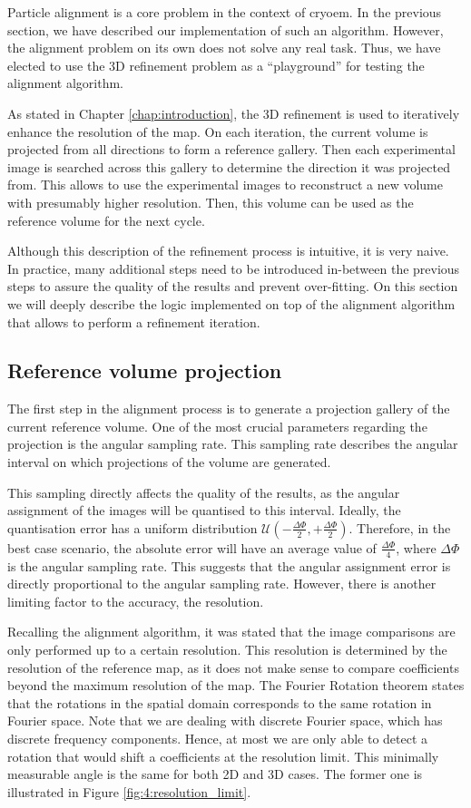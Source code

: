 \documentclass[../main.tex]{subfiles}
\begin{document}
Particle alignment is a core problem in the context of \gls{cryoem}. In the previous section, we have described our implementation of such an algorithm. However, the alignment problem on its own does not solve any real task. Thus, we have elected to use the 3D refinement problem as a ``playground'' for testing the alignment algorithm.

As stated in Chapter \ref{chap:introduction}, the 3D refinement is used to iteratively enhance the resolution of the map. On each iteration, the current volume is projected from all directions to form a reference gallery. Then each experimental image is searched across this gallery to determine the direction it was projected from. This allows to use the experimental images to reconstruct a new volume with presumably higher resolution. Then, this volume can be used as the reference volume for the next cycle.

Although this description of the refinement process is intuitive, it is very naive. In practice, many additional steps need to be introduced in-between the previous steps to assure the quality of the results and prevent over-fitting. On this section we will deeply describe the logic implemented on top of the alignment algorithm that allows to perform a refinement iteration.

\subsection{Reference volume projection}
The first step in the alignment process is to generate a projection gallery of the current reference volume. One of the most crucial parameters regarding the projection is the angular sampling rate. This sampling rate describes the angular interval on which projections of the volume are generated. 

This sampling directly affects the quality of the results, as the angular assignment of the images will be quantised to this interval. Ideally, the quantisation error has a uniform distribution $\mathcal{U}(-\frac{\Delta\Phi}{2}, +\frac{\Delta\Phi}{2})$. Therefore, in the best case scenario, the absolute error will have an average value of $\frac{\Delta\Phi}{4}$, where $\Delta\Phi$ is the angular sampling rate. This suggests that the angular assignment error is directly proportional to the angular sampling rate. However, there is another limiting factor to the accuracy, the resolution. 

Recalling the alignment algorithm, it was stated that the image comparisons are only performed up to a certain resolution. This resolution is determined by the resolution of the reference map, as it does not make sense to compare coefficients beyond the maximum resolution of the map. The Fourier Rotation theorem states that the rotations in the spatial domain corresponds to the same rotation in Fourier space. Note that we are dealing with discrete Fourier space, which has discrete frequency components.  Hence, at most we are only able to detect a rotation that would shift a coefficients at the resolution limit. This minimally measurable angle is the same for both 2D and 3D cases. The former one is illustrated in Figure \ref{fig:4:resolution_limit}. 
\end{document}
